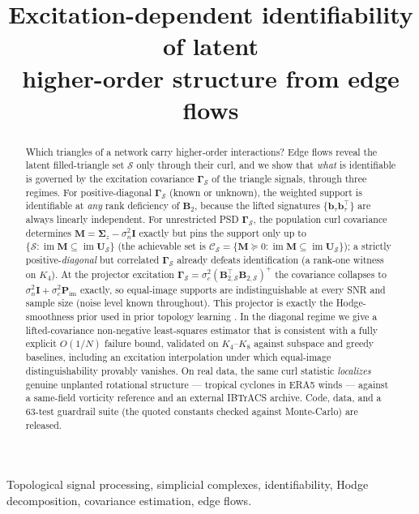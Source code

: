 \documentclass{article}
\title{Excitation-dependent identifiability of latent\\ higher-order structure from edge flows}
\DeclareMathOperator{\im}{im}
\newcommand{\B}{\bm{B}}
\newcommand{\Scal}{\mathcal{S}}
\newcommand{\Ccal}{\mathcal{C}}
\newcommand{\Gam}{\bm{\Gamma}}
\begin{document}
\maketitle

\begin{abstract}
Which triangles of a network carry higher-order interactions? Edge flows
reveal the latent filled-triangle set $\Scal$ only through their curl, and
we show that \emph{what} is identifiable is governed by the excitation
covariance $\Gam_\Scal$ of the triangle signals, through three regimes. For
positive-diagonal $\Gam_\Scal$ (known or unknown), the weighted support is
identifiable at \emph{any} rank deficiency of $\B_2$, because the lifted
signatures $\{\bm b_\tau\bm b_\tau^{\!\top}\}$ are always linearly
independent. For unrestricted PSD $\Gam_\Scal$, the population curl covariance
determines $\bm M=\bm\Sigma_z-\sigma_n^2\bm I$ exactly but pins the support
only up to $\{\Scal:\im\bm M\subseteq\im\bm U_\Scal\}$ (the achievable set is
$\Ccal_\Scal=\{\bm M\!\succeq\!0:\im\bm M\subseteq\im\bm U_\Scal\}$); a strictly
positive-\emph{diagonal} but correlated $\Gam_\Scal$ already defeats
identification (a rank-one witness on $K_4$). At the projector excitation
$\Gam_\Scal=\sigma_c^2(\B_{2,\Scal}^{\!\top}\B_{2,\Scal})^{+}$ the covariance
collapses to $\sigma_n^2\bm I+\sigma_c^2\bm P_{\im}$ exactly, so equal-image
supports are indistinguishable at every SNR and sample size (noise level
known throughout). This projector is exactly the Hodge-smoothness prior
used in prior topology learning \cite{gurugubelli2024simplicial}. In the diagonal
regime we give a lifted-covariance non-negative least-squares estimator that
is consistent with a fully explicit $O(1/N)$ failure bound, validated on
$K_4$--$K_8$ against subspace and greedy baselines, including an excitation
interpolation under which equal-image distinguishability provably vanishes.
On real data, the same curl statistic \emph{localizes} genuine unplanted
rotational structure --- tropical cyclones in ERA5 winds --- against a
same-field vorticity reference and an external IBTrACS archive. Code,
data, and a 63-test guardrail suite (the quoted constants checked against Monte-Carlo) are released.
\end{abstract}

\begin{keywords}
Topological signal processing, simplicial complexes, identifiability,
Hodge decomposition, covariance estimation, edge flows.
\end{keywords}
\end{document}

